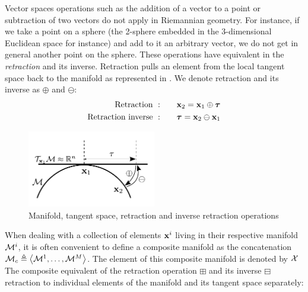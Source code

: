 Vector spaces operations such as the addition of a vector to a point or subtraction of two vectors do not apply in Riemannian geometry. For instance, if we
take a point on a sphere (the 2-sphere embedded in the 3-dimensional Euclidean space for instance) and add to it an arbitrary vector, we do not get in general
another point on the sphere. These operations have equivalent in the \textit{retraction} and its inverse.
Retraction pulls an element from the local tangent space back to the manifold as represented in . We denote retraction and its inverse as 
$\oplus$ and $\ominus$:
%
\begin{align}
            \text{Retraction}~:&\quad\quad {\bf x}_2 = {\bf x}_1 \oplus {\bm \tau}   \\
    \text{Retraction inverse}~:&\quad\quad {\bm \tau} = {\bf x}_2 \ominus {\bf x}_1  \\
\end{align}


\begin{figure}[h]
    \centering
    \includegraphics[width=0.5\textwidth]{figures/manifold.pdf}
    \caption{Manifold, tangent space, retraction and inverse retraction operations}
    \label{fig:manifold}
\end{figure}

When dealing with a collection of elements ${\bf x}^i$ living in their respective manifold $\mathcal{M}^i$, it is often convenient to define a composite manifold
as the concatenation $\mathcal{M}_c \triangleq \left<\mathcal{M}^1, \dots, \mathcal{M}^M \right>$. The element of this composite manifold is denoted by $\mathcal{X}$
The composite equivalent of the retraction operation $\boxplus$ and 
its inverse $\boxminus$ retraction to individual elements of the manifold and its tangent space separately:

